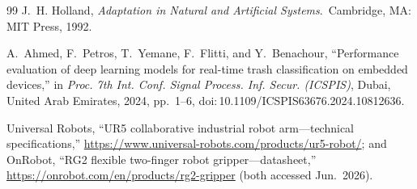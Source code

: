 \documentclass[conference]{IEEEtran}
\begin{document}
\begin{thebibliography}{99}
J.~H. Holland, \emph{Adaptation in Natural and Artificial Systems}.\ Cambridge, MA: MIT Press, 1992.

A.~Ahmed, F.~Petros, T.~Yemane, F.~Flitti, and Y.~Benachour, ``Performance evaluation of deep
learning models for real-time trash classification on embedded devices,'' in \emph{Proc. 7th
Int. Conf. Signal Process. Inf. Secur. (ICSPIS)}, Dubai, United Arab Emirates, 2024, pp.~1--6,
doi:\,10.1109/ICSPIS63676.2024.10812636.

Universal Robots, ``UR5 collaborative industrial robot arm---technical specifications,''
\url{https://www.universal-robots.com/products/ur5-robot/}; and OnRobot, ``RG2 flexible
two-finger robot gripper---datasheet,'' \url{https://onrobot.com/en/products/rg2-gripper}
(both accessed Jun.~2026).
\end{thebibliography}
\end{document}
